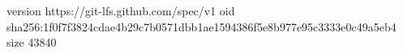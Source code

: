 version https://git-lfs.github.com/spec/v1
oid sha256:1f0f7f3824cdae4b29c7b0571dbb1ae1594386f5e8b977e95c3333e0c49a5eb4
size 43840
